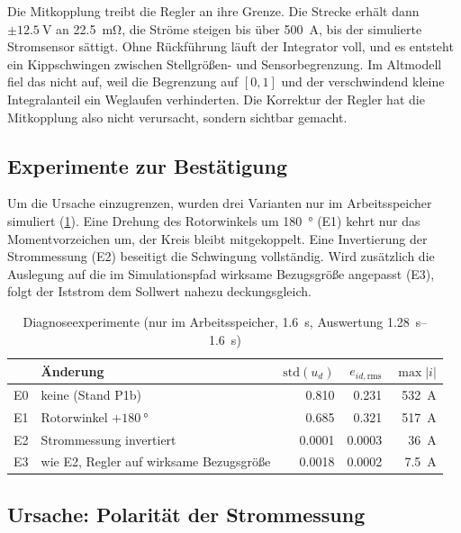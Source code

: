 Die Mitkopplung treibt die Regler an ihre Grenze. Die Strecke erhält dann
$\pm\SI{12,5}{\volt}$ an \SI{22,5}{\milli\ohm}, die Ströme steigen bis über \SI{500}{\ampere},
bis der simulierte Stromsensor sättigt. Ohne Rückführung läuft der Integrator voll, und es
entsteht ein Kippschwingen zwischen Stellgrößen- und Sensorbegrenzung. Im Altmodell fiel das
nicht auf, weil die Begrenzung auf $[0, 1]$ und der verschwindend kleine Integralanteil ein
Weglaufen verhinderten. Die Korrektur der Regler hat die Mitkopplung also nicht verursacht,
sondern sichtbar gemacht.

\subsection{Experimente zur Bestätigung}

Um die Ursache einzugrenzen, wurden drei Varianten nur im Arbeitsspeicher simuliert
(\cref{tab:diag}). Eine Drehung des Rotorwinkels um \SI{180}{\degree} (E1) kehrt nur das
Momentvorzeichen um, der Kreis bleibt mitgekoppelt. Eine Invertierung der Strommessung (E2)
beseitigt die Schwingung vollständig. Wird zusätzlich die Auslegung auf die im
Simulationspfad wirksame Bezugsgröße angepasst (E3), folgt der Iststrom dem Sollwert nahezu
deckungsgleich.

\begin{table}[htbp]
  \centering
  \caption{Diagnoseexperimente (nur im Arbeitsspeicher, \SI{1,6}{\second},
    Auswertung \SIrange{1,28}{1,6}{\second})}
  \label{tab:diag}
  \small
  \begin{tabularx}{\linewidth}{@{}l>{\raggedright\arraybackslash}Xrrr@{}}
    \toprule
    & Änderung & $\mathrm{std}(u_d)$ & $e_{id,\mathrm{rms}}$ & $\max |i|$ \\
    \midrule
    E0 & keine (Stand P1b) & \num{0,810} & \num{0,231} & \SI{532}{\ampere} \\
    E1 & Rotorwinkel $+\SI{180}{\degree}$ & \num{0,685} & \num{0,321} & \SI{517}{\ampere} \\
    E2 & Strommessung invertiert & \num{0,0001} & \num{0,0003} & \SI{36}{\ampere} \\
    E3 & wie E2, Regler auf wirksame Bezugsgröße & \num{0,0018} & \num{0,0002} & \SI{7,5}{\ampere} \\
    \bottomrule
  \end{tabularx}
\end{table}

\subsection{Ursache: Polarität der Strommessung}

